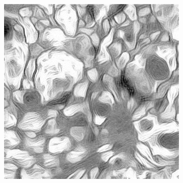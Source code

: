 \documentclass[12pt, a4paper]{scrartcl}
\begin{document}
\begin{figure}[H]
\begin{subfigure}{.28\textwidth}
  \label{fig:nas102}
\end{subfigure}
\begin{subfigure}{.34\textwidth}
  \centering
  \includegraphics[width=.9\linewidth]{stylized-train0-style10-150}

  \label{fig:nas103}
\end{subfigure}
\label{fig:neuron_art_style10}
\end{figure}
\end{document}
